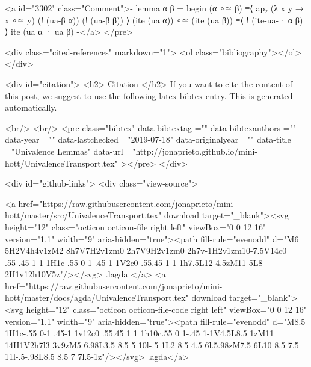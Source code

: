   <a id="3302" class="Comment">{- lemma α β =
        begin
          (α ∘≃ β)
            ≡⟨ ap₂ (λ x y → x ∘≃ y) (! (ua-β α)) (! (ua-β β)) ⟩
          (ite (ua α)) ∘≃ (ite (ua β))
            ≡⟨ ! (ite-ua-· α β) ⟩
          ite (ua α · ua β)
  -}</a>
</pre>


  <div class="cited-references" markdown="1">
  <ol class="bibliography"></ol>
  </div>


  
  <div id="citation">
  <h2> Citation </h2>
  If you want to cite the content of this post,
  we suggest to use the following latex bibtex entry.
  This is generated automatically.

  <br/>
  <br/>
  <pre class="bibtex"
       data-bibtextag =""
       data-bibtexauthors =""
       data-year =""
       data-lastchecked ="2019-07-18"
       data-originalyear =""
       data-title ="Univalence Lemmas"
       data-url ="http://jonaprieto.github.io/mini-hott/UnivalenceTransport.tex"
  ></pre>
  </div>
  

  <div id="github-links">
    <div class="view-source">
      
        <a href="https://raw.githubusercontent.com/jonaprieto/mini-hott/master/src/UnivalenceTransport.tex" download target="_blank"><svg height="12" class="octicon octicon-file right left" viewBox="0 0 12 16" version="1.1" width="9" aria-hidden="true"><path fill-rule="evenodd" d="M6 5H2V4h4v1zM2 8h7V7H2v1zm0 2h7V9H2v1zm0 2h7v-1H2v1zm10-7.5V14c0 .55-.45 1-1 1H1c-.55 0-1-.45-1-1V2c0-.55.45-1 1-1h7.5L12 4.5zM11 5L8 2H1v12h10V5z"/></svg> .lagda </a>
        <a href="https://raw.githubusercontent.com/jonaprieto/mini-hott/master/docs/agda/UnivalenceTransport.tex" download target="_blank"><svg height="12" class="octicon octicon-file-code right left" viewBox="0 0 12 16" version="1.1" width="9" aria-hidden="true"><path fill-rule="evenodd" d="M8.5 1H1c-.55 0-1 .45-1 1v12c0 .55.45 1 1 1h10c.55 0 1-.45 1-1V4.5L8.5 1zM11 14H1V2h7l3 3v9zM5 6.98L3.5 8.5 5 10l-.5 1L2 8.5 4.5 6l.5.98zM7.5 6L10 8.5 7.5 11l-.5-.98L8.5 8.5 7 7l.5-1z"/></svg> .agda</a>
      

